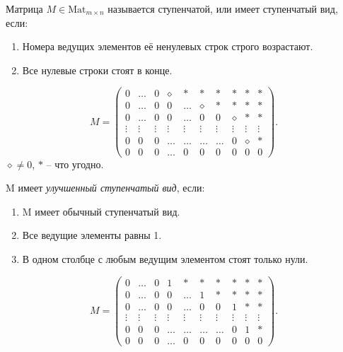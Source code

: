 \begin{definition}
    Матрица $M \in \text{Mat}_{m \times n}$ называется ступенчатой, или имеет ступенчатый вид, если:
    \begin{enumerate}
    \item Номера ведущих элементов её ненулевых строк строго возрастают.
    \item Все нулевые строки стоят в конце.
    \end{enumerate}
\end{definition}
\begin{equation*}
    M = \begin{pmatrix}
        0 & \dots & 0 & \diamond & * & * & * & * & * & * \\
        0 & \dots & 0 & 0 & \dots & \diamond & * & * & * & * \\
        0 & \dots & 0 & 0 & \dots & 0 & 0 & \diamond & * & * \\
        \vdots & \vdots & \vdots & \vdots & \vdots & \vdots & \vdots & \vdots & \vdots & \vdots \\
        0 & 0 & 0 & \dots & \dots & \dots & \dots & 0 & \diamond & * \\
        0 & 0 & 0 & \dots & 0 & 0 & 0 & 0 & 0 & 0
    \end{pmatrix}
.\end{equation*}
$\diamond \neq 0$, $*$ -- что угодно. 

\begin{definition}
    M имеет \textit{улучшенный ступенчатый вид}, если:

    \begin{enumerate}
    \item M имеет обычный ступенчатый вид.
    \item Все ведущие элементы равны 1.
    \item В одном столбце с любым ведущим элементом стоят только нули.
    \end{enumerate}
\end{definition}

\begin{equation*}
    M = \begin{pmatrix}
        0 & \dots & 0 & 1 & * & * & * & * & * & * \\
        0 & \dots & 0 & 0 & \dots & 1 & * & * & * & * \\
        0 & \dots & 0 & 0 & \dots & 0 & 0 & 1 & * & * \\
        \vdots & \vdots & \vdots & \vdots & \vdots & \vdots & \vdots & \vdots & \vdots & \vdots \\
        0 & 0 & 0 & \dots & \dots & \dots & \dots & 0 & 1 & * \\
        0 & 0 & 0 & \dots & 0 & 0 & 0 & 0 & 0 & 0
    \end{pmatrix}
.\end{equation*}

